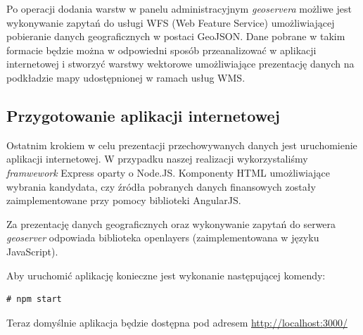 \documentclass[10pt,a4paper]{article}
\begin{document}
Po operacji dodania warstw w panelu administracyjnym \textit{geoservera} możliwe jest wykonywanie zapytań do usługi WFS (Web Feature Service) umożliwiającej pobieranie danych geograficznych w postaci GeoJSON. Dane pobrane w takim formacie będzie można w odpowiedni sposób przeanalizować w aplikacji internetowej i stworzyć warstwy wektorowe umożliwiające prezentację danych na podkładzie mapy udostępnionej w ramach usług WMS.

\subsection{Przygotowanie aplikacji internetowej}
Ostatnim krokiem w celu prezentacji przechowywanych danych jest uruchomienie aplikacji internetowej. W przypadku naszej realizacji wykorzystaliśmy \textit{framwework} Express oparty o Node.JS. Komponenty HTML umożliwiające wybrania kandydata, czy źródła pobranych danych finansowych zostały zaimplementowane przy pomocy biblioteki AngularJS. 

Za prezentację danych geograficznych oraz wykonywanie zapytań do serwera \textit{geoserver} odpowiada biblioteka openlayers (zaimplementowana w języku JavaScript).

\bigskip \noindent
Aby uruchomić aplikację konieczne jest wykonanie następującej komendy:
\begin{lstlisting}[style=BashInputStyle]
  # npm start
\end{lstlisting}

Teraz domyślnie aplikacja będzie dostępna pod adresem \url{http://localhost:3000/}
\end{document}
